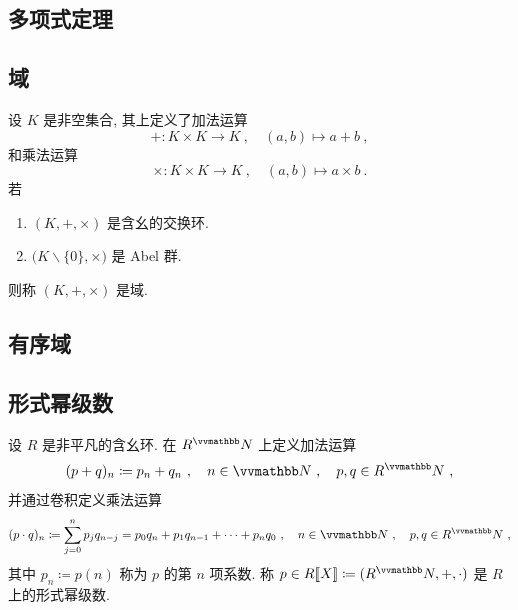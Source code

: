 \subsection{多项式定理}

\subsection{域}

\begin{axiom}[域]
    设 \(K\) 是非空集合, 其上定义了加法运算
    \[
        + \colon K \times K \to K\ ,\quad (a, b) \mapsto a + b\ ,
    \]
    和乘法运算
    \[
        \times \colon K \times K \to K\ ,\quad (a, b) \mapsto a \times b\ .
    \]
    若
    \begin{enumerate}[label={\((\mathrm F_{\arabic*})\)}]
        \item \((K, +, \times)\) 是含幺的交换环.
        \item \(\bigl(K \backslash \{0\}, \times\bigr)\) 是 Abel 群.
    \end{enumerate}
    则称 \((K, +, \times)\) 是域.
\end{axiom}

\subsection{有序域}

\begin{proposition}
    
\end{proposition}

\begin{proposition}\label{prop:property-of-abs-in-ordered-filed}
    
\end{proposition}

\begin{corollary}
    
\end{corollary}

\subsection{形式幂级数}

\begin{definition}[形式幂级数]
    设 \(R\) 是非平凡的含幺环. 在 \(R^\N\) 上定义加法运算
    \[
        (p + q)_n \coloneqq p_n + q_n\ ,\quad n \in \N\ ,\quad p, q \in R^\N\ ,
    \]
    并通过卷积定义乘法运算
    \begin{align}\label{exp:product-of-formal-power-series}
        (p \cdot q)_n \coloneqq \sum_{j = 0}^n p_j q_{n - j} = p_0 q_n + p_1 q_{n - 1} + \cdots + p_n q_0\ ,\quad n \in \N\ ,\quad p, q \in R^\N\ ,
    \end{align}
    其中 \(p_n \coloneqq p(n)\) 称为 \(p\) 的第 \(n\) 项系数. 称 \(p \in R[\![X]\!] \coloneqq (R^\N, +, \cdot)\) 是 \(R\) 上的形式幂级数.
\end{definition}

